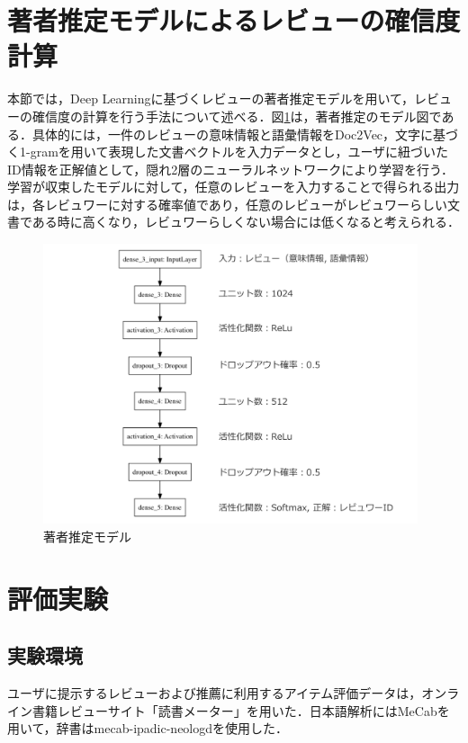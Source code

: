 \documentclass[a4paper,11pt,oneside,openany]{jsbook}
\begin{document}
	\section{著者推定モデルによるレビューの確信度計算}
\label{subsec:p}
本節では，Deep Learningに基づくレビューの著者推定モデルを用いて，レビューの確信度の計算を行う手法について述べる．図\ref{fig:author_model}は，著者推定のモデル図である．具体的には，一件のレビューの意味情報と語彙情報をDoc2Vec\cite{doc2vec}，文字に基づく1-gramを用いて表現した文書ベクトルを入力データとし，ユーザに紐づいたID情報を正解値として，隠れ2層のニューラルネットワークにより学習を行う．学習が収束したモデルに対して，任意のレビューを入力することで得られる出力は，各レビュワーに対する確率値であり，任意のレビューがレビュワーらしい文書である時に高くなり，レビュワーらしくない場合には低くなると考えられる．

\begin{figure}[tb]
	\begin{center} %
		\includegraphics [width = 110mm] {figures/author_model.pdf} %
	\end{center}
	\caption{著者推定モデル} %
	\label{fig:author_model} %
\end{figure}

	\section{評価実験}
		\subsection{実験環境}
ユーザに提示するレビューおよび推薦に利用するアイテム評価データは，オンライン書籍レビューサイト「読書メーター」を用いた．日本語解析にはMeCab\cite{mecab}を用いて，辞書はmecab-ipadic-neologd\cite{mecabdic}を使用した．
\end{document}
